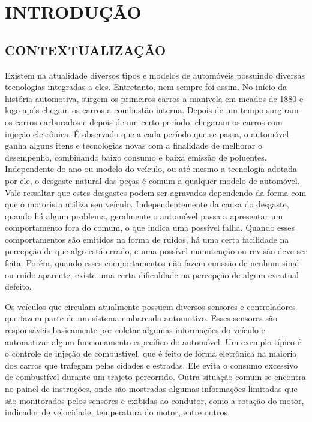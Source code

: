\chapter{INTRODUÇÃO}\label{CAP:introducao}

\section{CONTEXTUALIZAÇÃO}
Existem na atualidade diversos tipos e modelos de automóveis possuindo diversas tecnologias integradas a eles. Entretanto, nem sempre foi assim. No início da história automotiva, surgem os primeiros carros a manivela em meados de 1880 e logo após chegam os carros a combustão interna. Depois de um tempo surgiram os carros carburados e depois de um certo período, chegaram os carros com injeção eletrônica. É observado que a cada período que se passa, o automóvel ganha alguns itens e tecnologias novas com a finalidade de melhorar o desempenho, combinando baixo consumo e baixa emissão de poluentes. Independente do ano ou modelo do veículo, ou até mesmo a tecnologia adotada por ele, o desgaste natural das peças é comum a qualquer modelo de automóvel. Vale ressaltar que estes desgastes podem ser agravados dependendo da forma com que o motorista utiliza seu veículo. Independentemente da causa do desgaste, quando há algum problema, geralmente o automóvel passa a apresentar um comportamento fora do comum, o que indica uma possível falha. Quando esses comportamentos são emitidos na forma de ruídos, há uma certa facilidade na percepção de que algo está errado, e uma possível manutenção ou revisão deve ser feita. Porém, quando esses comportamentos não fazem emissão de nenhum sinal ou ruído aparente, existe uma certa dificuldade na percepção de algum eventual defeito.

Os veículos que circulam atualmente possuem diversos sensores e controladores que fazem parte de um sistema embarcado automotivo. Esses sensores são responsáveis basicamente por coletar algumas informações do veículo e automatizar algum funcionamento específico do automóvel. Um exemplo típico é o controle de injeção de combustível, que é feito de forma eletrônica na maioria dos carros que trafegam pelas cidades e estradas. Ele evita o consumo excessivo de combustível durante um trajeto percorrido. Outra situação comum se encontra no painel de instruções, onde são mostradas algumas informações limitadas que são monitorados pelos sensores e exibidas ao condutor, como a rotação do motor, indicador de velocidade, temperatura do motor, entre outros. 

